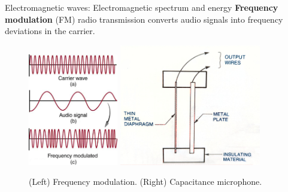\documentclass{beamer}
\begin{document}
\begin{frame}{Electromagnetic waves: Electromagnetic spectrum and energy}
\small
\textbf{\alert{Frequency modulation}} (FM) radio transmission converts audio signals into frequency deviations in the carrier.
\begin{figure}
\centering
\includegraphics[width=0.35\textwidth]{figures/FM.png}
\includegraphics[width=0.55\textwidth]{figures/FMSpec.pdf}
\caption{\label{fig:radio2} \footnotesize (Left) Frequency modulation. (Right) Capacitance microphone.}
\end{figure}
\end{frame}
\end{document}
